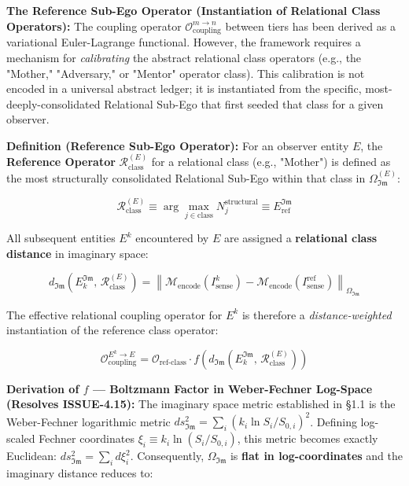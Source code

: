 \documentclass[11pt,a4paper]{article}
\theoremstyle{definition}
\theoremstyle{remark}
\begin{document}
\textbf{The Reference Sub-Ego Operator (Instantiation of Relational Class Operators):} The coupling operator $\mathcal{O}_{\text{coupling}}^{m \to n}$ between tiers has been derived as a variational Euler-Lagrange functional. However, the framework requires a mechanism for \textit{calibrating} the abstract relational class operators (e.g., the "Mother," "Adversary," or "Mentor" operator class). This calibration is not encoded in a universal abstract ledger; it is instantiated from the specific, most-deeply-consolidated Relational Sub-Ego that first seeded that class for a given observer.

\textbf{Definition (Reference Sub-Ego Operator):} For an observer entity $E$, the \textbf{Reference Operator} $\mathcal{R}_{\text{class}}^{(E)}$ for a relational class (e.g., "Mother") is defined as the most structurally consolidated Relational Sub-Ego within that class in $\Omega_{\mathfrak{Im}}^{(E)}$:


\begin{equation}
\boxed{\mathcal{R}_{\text{class}}^{(E)} \equiv \arg\max_{j \in \text{class}} N_j^{\text{structural}} \equiv E_{\text{ref}}^{\mathfrak{Im}}}
\end{equation}


All subsequent entities $E^k$ encountered by $E$ are assigned a \textbf{relational class distance} in imaginary space:


\begin{equation}
d_{\mathfrak{Im}}\!\left(E_k^{\mathfrak{Im}},\, \mathcal{R}_{\text{class}}^{(E)}\right) = \left\| \mathcal{M}_{\text{encode}}(I_{\text{sense}}^k) - \mathcal{M}_{\text{encode}}(I_{\text{sense}}^{\text{ref}}) \right\|_{\Omega_{\mathfrak{Im}}}
\end{equation}


The effective relational coupling operator for $E^k$ is therefore a \textit{distance-weighted} instantiation of the reference class operator:


\begin{equation}
\boxed{\mathcal{O}_{\text{coupling}}^{E^k \to E} = \mathcal{O}_{\text{ref-class}} \cdot f\!\left( d_{\mathfrak{Im}}\!\left(E_k^{\mathfrak{Im}},\, \mathcal{R}_{\text{class}}^{(E)}\right) \right)}
\end{equation}


\textbf{Derivation of $f$ — Boltzmann Factor in Weber-Fechner Log-Space (Resolves ISSUE-4.15):} The imaginary space metric established in \S 1.1 is the Weber-Fechner logarithmic metric $ds_{\mathfrak{Im}}^2 = \sum_i \left(k_i \ln S_i/S_{0,i}\right)^2$. Defining log-scaled Fechner coordinates $\xi_i \equiv k_i \ln(S_i/S_{0,i})$, this metric becomes exactly Euclidean: $ds_{\mathfrak{Im}}^2 = \sum_i d\xi_i^2$. Consequently, $\Omega_{\mathfrak{Im}}$ is \textbf{flat in log-coordinates} and the imaginary distance reduces to:
\end{document}
